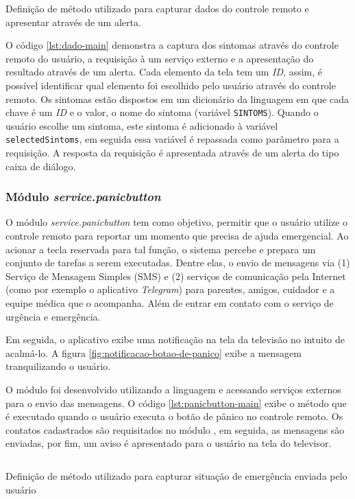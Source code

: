 \begin{listing}[ht!]
\inputminted{python}{codigos/dado-main.py}
\caption{Definição de método utilizado para capturar dados do controle remoto
e apresentar através de um alerta.}
\label{lst:dado-main}
\end{listing}

O código \ref{lst:dado-main} demonstra a captura dos sintomas através do
controle remoto do usuário, a requisição à um serviço externo e a apresentação
do resultado através de um alerta. Cada elemento da tela tem um \textit{ID},
assim, é possível identificar qual elemento foi escolhido pelo usuário através
do controle remoto.  Os sintomas estão dispostos em um dicionário da linguagem
\python[] em que cada chave é um \textit{ID} e o valor, o nome do sintoma
(variável \texttt{SINTOMS}). Quando o usuário escolhe um sintoma, este sintoma
é adicionado à variável \texttt{selectedSintoms}, em seguida essa variável é
repassada como parâmetro para a requisição. A resposta da requisição é apresentada
através de um alerta do tipo caixa de diálogo.

\subsubsection{Módulo \textit{service.panicbutton}}\label{subsubsec:panicbutton}

O módulo \textit{service.panicbutton} tem como objetivo, permitir que o usuário
utilize o controle remoto para reportar um momento que precisa de ajuda 
emergencial. Ao acionar a tecla reservada para tal função, o sistema percebe e
prepara um conjunto de tarefas a serem executadas. Dentre elas, o envio de 
mensagens via (1) Serviço de Mensagem Simples (SMS) e (2) serviços de comunicação
pela Internet (como por exemplo o aplicativo \textit{Telegram}) para parentes, 
amigos, cuidador e a equipe médica que o acompanha. Além de entrar em contato
com o serviço de urgência e emergência.

Em seguida, o aplicativo exibe uma notificação na tela da televisão no intuito
de acalmá-lo. A figura \ref{fig:notificacao-botao-de-panico} exibe a mensagem 
tranquilizando o usuário.

O módulo foi desenvolvido utilizando a linguagem \python[] e acessando serviços
externos para o envio das mensagens. O código \ref{lst:panicbutton-main} exibe
o método que é executado quando o usuário executa o botão de pânico no controle
remoto. Os contatos cadastrados são requisitados no módulo \web, em seguida, as
mensagens são enviadas, por fim, um aviso é apresentado para o usuário na tela
do televisor.

\begin{listing}[ht!]
\inputminted{python}{codigos/panicbutton-main.py}
\caption{Definição de método utilizado para capturar situação de emergência enviada
pelo usuário}
\label{lst:panicbutton-main}
\end{listing}
